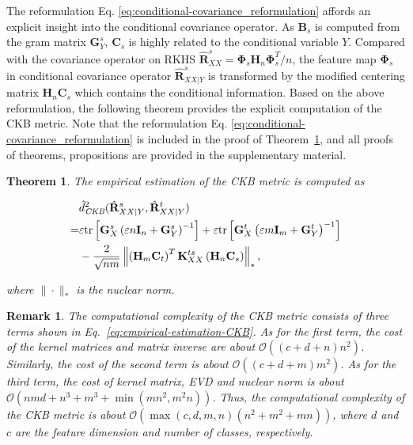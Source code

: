 \documentclass[final]{cvpr}
\newcommand{\MC}{\mathcal}
\newcommand{\MBF}{\mathbf}
\newtheorem{theorem}{Theorem}
\newtheorem{remark}{Remark}
\begin{document}
The reformulation Eq. \eqref{eq:conditional-covariance_reformulation} affords an explicit insight into the conditional covariance operator. As $\MBF{B}_s$ is computed from the gram matrix $\MBF{G}^s_{Y}$, $\MBF{C}_s$ is highly related to the conditional variable $Y$. Compared with the covariance operator on RKHS $\hat{\MBF{R}}^s_{XX}= \MBF{\Phi}_s \MBF{H}_{n}  \MBF{\Phi}_s^T /n$, the feature map $\MBF{\Phi}_s$ in conditional covariance operator $\hat{\MBF{R}}^s_{XX|Y}$ is transformed by the modified centering matrix $\MBF{H}_{n} \MBF{C}_s$ which contains the conditional information. Based on the above reformulation, the following theorem provides the explicit computation of the CKB metric. Note that the reformulation Eq. \eqref{eq:conditional-covariance_reformulation} is included in the proof of Theorem~\ref{thm:empirical-estimation-CKB}, and all proofs of theorems, propositions are provided in the supplementary material.

\begin{theorem}\label{thm:empirical-estimation-CKB}
The empirical estimation of the CKB metric is computed as
\begin{small}
\begin{align}
~& \hat{d}_{\emph{CKB}}^2(\hat{\MBF{R}}^{s}_{XX|Y},\hat{\MBF{R}}^{t}_{XX|Y}) \nonumber \\
=&  \varepsilon {\rm tr} \left[ \MBF{G}^{s}_X \left( \varepsilon n \MBF{I}_n + \MBF{G}^{s}_Y \right)^{-1} \right]
+ \varepsilon {\rm tr} \left[ \MBF{G}^{t}_X \left( \varepsilon m \MBF{I}_m + \MBF{G}^{t}_Y \right)^{-1} \right] \nonumber \\
~& - \frac{2}{\sqrt{nm}} \left\| \left( \MBF{H}_m \MBF{C}_t \right)^T  \MBF{K}^{ts}_{XX}  \left( \MBF{H}_n \MBF{C}_s \right) \right\|_* , \label{eq:empirical-estimation-CKB}
\end{align}
\end{small}
where $\| \cdot \|_*$ is the nuclear norm.
\end{theorem}
\begin{remark}\label{rem:complexity-CKB}
The computational complexity of the CKB metric consists of three terms shown in Eq.~\eqref{eq:empirical-estimation-CKB}. As for the first term, the cost of the kernel matrices and matrix inverse are about $\MC{O}((c+d+n)n^2)$. Similarly, the cost of the second term is about $\MC{O}((c+d+m)m^2)$. As for the third term, the cost of kernel matrix, EVD and nuclear norm is about $\MC{O}(nmd+n^3+m^3+\min(mn^2,m^2n))$. Thus, the computational complexity of the CKB metric is about $\MC{O}(\max(c,d,m,n)(n^2+m^2+mn))$, where $d$ and $c$ are the feature dimension and number of classes, respectively.
\end{remark}
\end{document}
